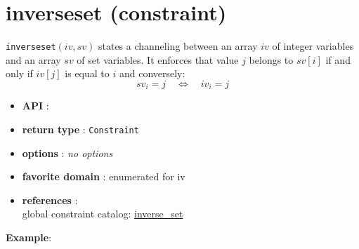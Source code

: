 \label{inverseset}
\hypertarget{inverseset}{}

\section{inverseset (constraint)}\label{inverseset:inversesetconstraint}\hypertarget{inverseset:inversesetconstraint}{}
\begin{notedef}
  \texttt{inverseset}$(iv,sv)$ states a channeling between an array  $iv$ of integer variables and an array $sv$ of set variables. It enforces that value $j$ belongs to $sv[i]$ if and only if $iv[j]$ is equal to $i$ and conversely:
$$sv_i = j\quad\iff\quad iv_i = j$$
\end{notedef}
\begin{itemize}
	\item \textbf{API} : 
	\item \textbf{return type} : \texttt{Constraint}
	\item \textbf{options} : \emph{no options}
	\item \textbf{favorite domain} : enumerated for iv
	\item \textbf{references} :\\
      global constraint catalog: \href{http://www.emn.fr/x-info/sdemasse/gccat/Cinverse_set.html}{inverse\_set}
\end{itemize}

\textbf{Example}:

